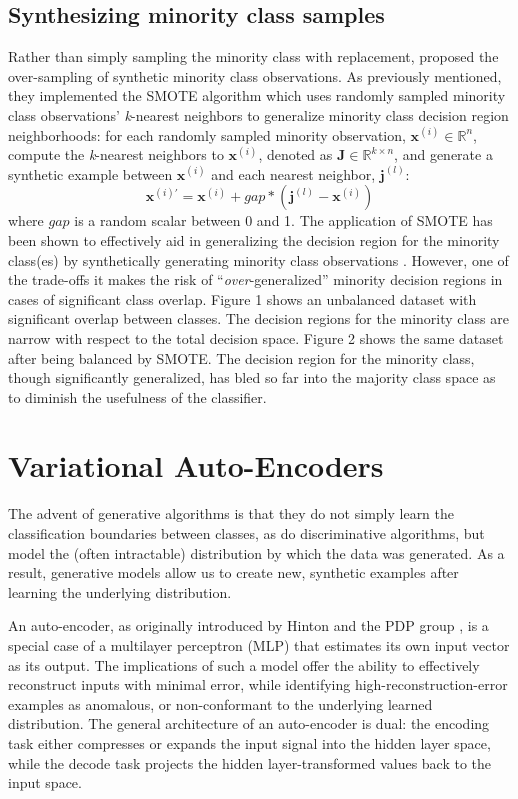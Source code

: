 \documentclass[twoside,11pt]{article}
\begin{document}
\subsection{Synthesizing minority class samples}

Rather than simply sampling the minority class with replacement, \cite{chawla2002smote} proposed the over-sampling of synthetic minority class observations.  As previously mentioned, they implemented the SMOTE algorithm which uses randomly sampled minority class observations' \emph{k}-nearest neighbors to generalize minority class decision region neighborhoods: for each randomly sampled minority observation, $\mathbf{x}^{(i)} \in \mathbb{R}^{n}$, compute the \emph{k}-nearest neighbors to $\mathbf{x}^{(i)}$, denoted as $\mathbf{J} \in \mathbb{R}^{k \times n}$, and generate a synthetic example between $\mathbf{x}^{(i)}$ and each nearest neighbor, $\mathbf{j}^{(l)}$:
\[
    \mathbf{x}^{(i)\prime} = \mathbf{x}^{(i)} + gap * (\mathbf{j}^{(l)} - \mathbf{x}^{(i)})
\]
where $gap$ is a random scalar between 0 and 1. The application of SMOTE has been shown to effectively aid in generalizing the decision region for the minority class(es) by synthetically generating minority class observations \citep*{chawla2002smote}. However, one of the trade-offs it makes the risk of ``\emph{over}-generalized'' minority decision regions in cases of significant class overlap. Figure 1 shows an unbalanced dataset with significant overlap between classes. The decision regions for the minority class are narrow with respect to the total decision space. Figure 2 shows the same dataset after being balanced by SMOTE. The decision region for the minority class, though significantly generalized, has bled so far into the majority class space as to diminish the usefulness of the classifier.

\section{Variational Auto-Encoders}

The advent of generative algorithms is that they do not simply learn the classification boundaries between classes, as do discriminative algorithms, but model the (often intractable) distribution by which the data was generated. As a result, generative models allow us to create new, synthetic examples after learning the underlying distribution. 

An auto-encoder, as originally introduced by Hinton and the PDP group \citep{rumelhart1985learning}, is a special case of a multilayer perceptron (MLP) that estimates its own input vector as its output. The implications of such a model offer the ability to effectively reconstruct inputs with minimal error, while identifying high-reconstruction-error examples as anomalous, or non-conformant to the underlying learned distribution. The general architecture of an auto-encoder is dual: the encoding task either compresses or expands the input signal into the hidden layer space, while the decode task projects the hidden layer-transformed values back to the input space.
\end{document}
